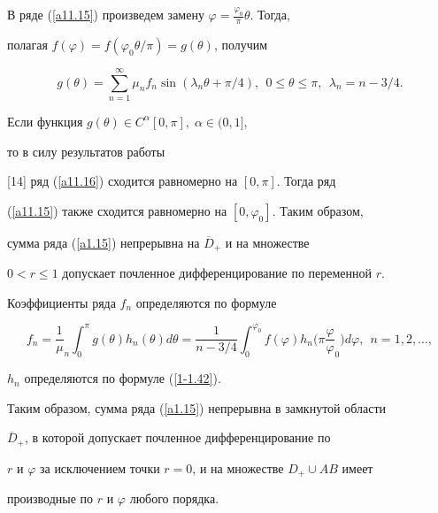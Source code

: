 В ряде (\ref{a11.15}) произведем замену $\varphi={\frac{\varphi_0}


{\pi}}\theta$. Тогда,


полагая $f(\varphi)=f(\varphi_0\theta/\pi)=g(\theta)$, получим


\begin{equation}


g(\theta)=\sum\limits_{n=1}^\infty\mu_n f_n\sin\left(\lambda_n\theta+


{\pi}/{4}\right),\ \ 0\leq\theta\leq\pi,\ \ \lambda_n=n-3/4.\label{a11.16}


\end{equation}





Если функция $g(\theta)\in C^\alpha[0,\pi],\;\alpha\in(0,1]$, 


то в силу результатов работы 


[14] ряд (\ref{a11.16}) сходится равномерно на $[0,\pi]$. Тогда ряд 


(\ref{a11.15}) также сходится равномерно на $[0,\varphi_0]$. Таким образом, 


сумма ряда (\ref{a1.15}) непрерывна на $\overline D_+$ и на множестве 


$0<r\leq 1$ допускает почленное дифференцирование по переменной $r$. 


Коэффициенты ряда $f_n$ определяются по формуле


\begin{equation}


f_n=\frac1\mu_n\int_0^{\pi} g(\theta)h_n(\theta)d\theta=


\frac{1}{n-3/4}\int_0^{\varphi_0} f(\varphi)h_n\bigg(\pi\frac


\varphi\varphi_0\bigg)d\varphi,\ \ n=1,2,\dotsc, \label{a1.14}


\end{equation}


$h_n$ определяются по формуле (\ref{1-1.42}).





Таким образом, сумма ряда (\ref{a1.15}) непрерывна в замкнутой области 


$\overline D_+$, в которой допускает почленное дифференцирование по 


$r$ и $\varphi$ за исключением точки $r=0$, и на множестве $D_+\cup AB$ имеет 


производные по $r$ и $\varphi$ любого порядка.





